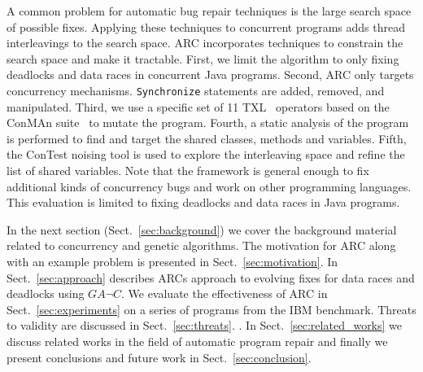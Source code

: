A common problem for automatic bug repair techniques is the large search space of possible fixes. Applying these techniques to  concurrent programs adds thread interleavings to the search space. ARC incorporates techniques to constrain the search space and make it tractable. First, we limit the algorithm to only fixing deadlocks and data races in concurrent Java programs. Second, ARC only targets concurrency mechanisms. \texttt{Synchronize} statements are added, removed, and manipulated. Third, we use a specific set of 11 TXL~\cite{CHP91} operators based on the ConMAn suite~\cite{BCD06} to mutate the program.  Fourth, a static analysis of the program is performed to find and target the shared classes, methods and variables. Fifth, the ConTest noising tool is used to explore the interleaving space and refine the list of shared variables.  Note that the framework is general enough to fix additional kinds of concurrency bugs and work on other programming languages. This evaluation is limited to fixing deadlocks and data races in Java programs.

In the next section (Sect.~\ref{sec:background}) we cover the background material related to concurrency and genetic algorithms. The motivation for ARC along with an example problem is presented in Sect.~\ref{sec:motivation}. In Sect.~\ref{sec:approach} describes ARCs approach to evolving fixes for data races and deadlocks using $GA \neg C$. We evaluate the effectiveness of ARC in Sect.~\ref{sec:experiments} on a series of programs from the IBM benchmark. Threats to validity are discussed in Sect.~\ref{sec:threats}. . In Sect.~\ref{sec:related_works} we discuss related works in the field of automatic program repair and finally we present conclusions and future work in Sect.~\ref{sec:conclusion}.



